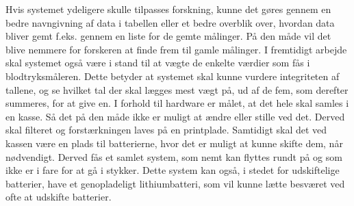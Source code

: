 Hvis systemet ydeligere skulle tilpasses forskning, kunne det gøres gennem en bedre navngivning af data i tabellen eller et bedre overblik over, hvordan data bliver gemt f.eks. gennem en liste for de gemte målinger. På den måde vil det blive nemmere for forskeren at finde frem til gamle målinger.
I fremtidigt arbejde skal systemet også være i stand til at vægte de enkelte værdier som fås i blodtryksmåleren. Dette betyder at systemet skal kunne vurdere integriteten af tallene, og se hvilket tal der skal lægges mest vægt på, ud af de fem, som derefter summeres, for at give en.   
\newline 
I forhold til hardware er målet, at det hele skal samles i en kasse. Så det på den måde ikke er muligt at ændre eller stille ved det. Derved skal filteret og forstærkningen laves på en printplade. Samtidigt skal det ved kassen være en plads til batterierne, hvor det er muligt at kunne skifte dem, når nødvendigt. Derved fås et samlet system, som nemt kan flyttes rundt på og som ikke er i fare for at gå i stykker. Dette system kan også, i stedet for udskiftelige batterier, have et genopladeligt lithiumbatteri, som vil kunne lætte besværet ved ofte at udskifte batterier.